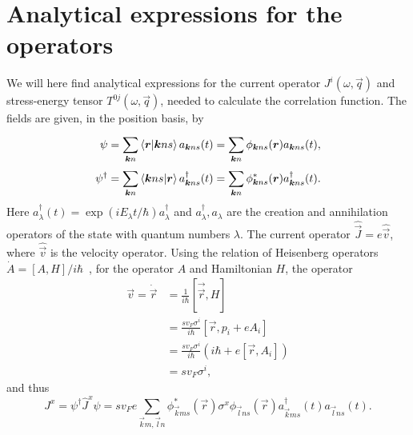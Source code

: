 \section{Analytical expressions for the operators}
We will here find analytical expressions for the current operator $J^i(\omega, \vec{q})$ and stress-energy tensor $T^{0j}(\omega, \vec{q})$, needed to calculate the correlation function.
The fields are given, in the position basis, by
\begin{align}
  \psi &= \sum\limits_{\bm{k}n}^{}\braket{\bm{r} | \bm{k} n s} a_{\bm{k}ns}(t) = \sum\limits_{\bm{k}n}^{} \phi_{\bm{k} n s} (\bm{r}) a_{\bm{k}n s}(t),\\
  \psi^{\dagger} &= \sum\limits_{\bm{k}n}^{}
                   \braket{\bm{k} ns | \bm{r} }
                   a^{\dagger}_{\bm{k}ns}(t)
                   =\sum\limits_{\bm{k}n}^{} \phi^{*}_{\bm{k} n s} (\bm{r}) a^{\dagger}_{\bm{k}n s}(t).
\end{align}
Here $a_{\lambda }^{\dagger} (t) = \exp(iE_{\lambda } t / \hbar) a_{\lambda }^{\dagger}$ and $a_{\lambda }^{\dagger}, a_{\lambda }$ are the creation and annihilation operators of the state with quantum numbers $\lambda $.
The current operator $\hat{\vec{J}} = e \hat{\vec{v}}$, where $\hat{\vec{v}}$ is the velocity operator.
Using the relation of Heisenberg operators $\dot{A} = [A, H] / i\hbar $~\cite{sakuraiModernQuantumMechanics2017}, for the operator $A$ and Hamiltonian $H$, the operator
\begin{align}
  \vec{v} = \dot{\vec{r}} &= \frac{1}{i \hbar } \left[ \vec{\vec{r}}, H \right]\\
              &= \frac{sv_F \sigma ^i}{i \hbar } \left[ \vec{r}, p_i + e A_i \right]\\
              &= \frac{s v_F \sigma^i }{i \hbar } \left( i\hbar + e[\vec{r}, A_i] \right)\\
              &=s v_F \sigma ^i,
\end{align}
and thus
\begin{equation}
  J^x = \psi ^{\dagger} \hat{J}^x \psi = sv_F e \sum\limits_{\vec{k}m, \vec{l}n}^{}
  \phi _{\vec{k}ms}^{*}(\vec{r}) \sigma ^x \phi _{\vec{l}ns}(\vec{r})
  a_{\vec{k}ms}^{\dagger}(t)
  a_{\vec{l}ns}(t).
\end{equation}

